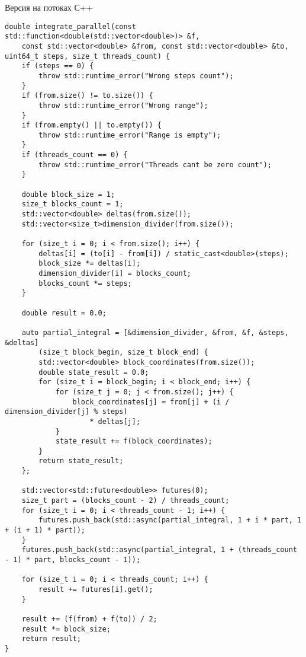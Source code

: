 \documentclass{report}
\begin{document}
\par Версия на потоках С++
\begin{lstlisting}
double integrate_parallel(const std::function<double(std::vector<double>)> &f,
    const std::vector<double> &from, const std::vector<double> &to, uint64_t steps, size_t threads_count) {
    if (steps == 0) {
        throw std::runtime_error("Wrong steps count");
    }
    if (from.size() != to.size()) {
        throw std::runtime_error("Wrong range");
    }
    if (from.empty() || to.empty()) {
        throw std::runtime_error("Range is empty");
    }
    if (threads_count == 0) {
        throw std::runtime_error("Threads cant be zero count");
    }

    double block_size = 1;
    size_t blocks_count = 1;
    std::vector<double> deltas(from.size());
    std::vector<size_t>dimension_divider(from.size());

    for (size_t i = 0; i < from.size(); i++) {
        deltas[i] = (to[i] - from[i]) / static_cast<double>(steps);
        block_size *= deltas[i];
        dimension_divider[i] = blocks_count;
        blocks_count *= steps;
    }

    double result = 0.0;

    auto partial_integral = [&dimension_divider, &from, &f, &steps, &deltas]
        (size_t block_begin, size_t block_end) {
        std::vector<double> block_coordinates(from.size());
        double state_result = 0.0;
        for (size_t i = block_begin; i < block_end; i++) {
            for (size_t j = 0; j < from.size(); j++) {
                block_coordinates[j] = from[j] + (i / dimension_divider[j] % steps)
                    * deltas[j];
            }
            state_result += f(block_coordinates);
        }
        return state_result;
    };

    std::vector<std::future<double>> futures(0);
    size_t part = (blocks_count - 2) / threads_count;
    for (size_t i = 0; i < threads_count - 1; i++) {
        futures.push_back(std::async(partial_integral, 1 + i * part, 1 + (i + 1) * part));
    }
    futures.push_back(std::async(partial_integral, 1 + (threads_count - 1) * part, blocks_count - 1));

    for (size_t i = 0; i < threads_count; i++) {
        result += futures[i].get();
    }

    result += (f(from) + f(to)) / 2;
    result *= block_size;
    return result;
}
\end{lstlisting}
\end{document}
